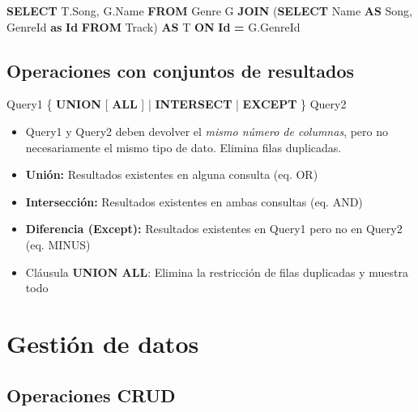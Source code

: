 \documentclass[
]{book}
\newenvironment{Shaded}{\begin{snugshade}}{\end{snugshade}}
\newcommand{\KeywordTok}[1]{\textcolor[rgb]{0.13,0.29,0.53}{\textbf{#1}}}
\newcommand{\NormalTok}[1]{#1}
\newcommand{\OperatorTok}[1]{\textcolor[rgb]{0.81,0.36,0.00}{\textbf{#1}}}
\providecommand{\tightlist}{%
  \setlength{\itemsep}{0pt}\setlength{\parskip}{0pt}}
\theoremstyle{break}
\theoremstyle{nonumberplain}
\begin{document}
\begin{Shaded}
\begin{Highlighting}[]
  \KeywordTok{SELECT}\NormalTok{ T.Song, G.Name }
  \KeywordTok{FROM}\NormalTok{ Genre G }\KeywordTok{JOIN}\NormalTok{ (}\KeywordTok{SELECT}\NormalTok{ Name }\KeywordTok{AS}\NormalTok{ Song, GenreId }\KeywordTok{as} \KeywordTok{Id} 
                     \KeywordTok{FROM}\NormalTok{ Track) }\KeywordTok{AS}\NormalTok{ T }
               \KeywordTok{ON} \KeywordTok{Id} \OperatorTok{=}\NormalTok{ G.GenreId }
\end{Highlighting}
\end{Shaded}

\subsection{Operaciones con conjuntos de resultados}\label{operaciones-con-conjuntos-de-resultados}

\begin{Shaded}
\begin{Highlighting}[]
\NormalTok{  Query1 }
\NormalTok{  \{ }\KeywordTok{UNION}\NormalTok{ [ }\KeywordTok{ALL}\NormalTok{ ] | }\KeywordTok{INTERSECT}\NormalTok{ | }\KeywordTok{EXCEPT}\NormalTok{ \} }
\NormalTok{  Query2 }
\end{Highlighting}
\end{Shaded}

\begin{itemize}
\tightlist
\item
  Query1 y Query2 deben devolver el \emph{mismo número de columnas}, pero no necesariamente el mismo tipo de dato.
  Elimina filas duplicadas.
\item
  \textbf{Unión:} Resultados existentes en alguna consulta (eq. OR)
\item
  \textbf{Intersección:} Resultados existentes en ambas consultas (eq. AND)
\item
  \textbf{Diferencia (Except):} Resultados existentes en Query1 pero no en Query2 (eq. MINUS)
\item
  Cláusula \textbf{UNION ALL}: Elimina la restricción de filas duplicadas y muestra todo
\end{itemize}

\section{Gestión de datos}\label{gestiuxf3n-de-datos}

\subsection{Operaciones CRUD}\label{operaciones-crud}
\end{document}
